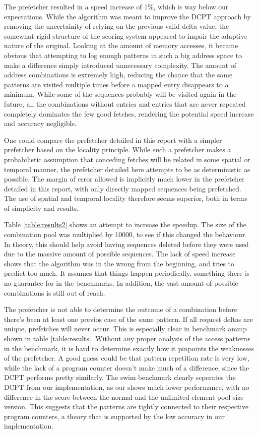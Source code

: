 The prefetcher resulted in a speed increase of 1\%, which is way below our expectations. While the algorithm was meant to improve the DCPT approach by removing the uncertainity of relying on the previous valid delta value, the somewhat rigid structure of the scoring system appeared to impair the adaptive nature of the original. Looking at the amount of memory accesses, it became obvious that attempting to log enough patterns in such a big address space to make a difference simply introduced unnecessary complexity. The amount of address combinations is extremely high, reducing the chance that the same patterns are visited multiple times before a mapped entry disappears to a minimum. While some of the sequences probably will be visited again in the future, all the combinations without entries and entries that are never repeated completely dominates the few good fetches, rendering the potential speed increase and accuracy negligible. 

One could compare the prefetcher detailed in this report with a simpler prefetcher based on the locality principle. While such a prefetcher makes a probabilistic assumption that conceding fetches will be related in some spatial or temporal manner, the prefetcher detailed here attempts to be as deterministic as possible. The margin of error allowed is implicitly much lower in the prefetcher detailed in this report, with only directly mapped sequences being prefetched. The use of spatial and temporal locality therefore seems superior, both in terms of simplicity and results.


Table \ref{table:results2} shows an attempt to increase the speedup. The size of the combination pool was multiplied by 10000, to see if this changed the behaviour. In theory, this should help avoid having sequences deleted before they were used due to the massive amount of possible sequences. The lack of speed increase shows that the algorithm was in the wrong from the beginning, and tries to predict too much. It assumes that things happen periodically, something there is no guarantee for in the benchmarks. In addition, the vast amount of possible combinations is still out of reach.

The prefetcher is not able to determine the outcome of a combination before there's been at least one previos case of the same pattern. If all request deltas are unique, prefetches will never occur. This is especially clear in benchmark ammp shown in table \ref{table:results}. Without any proper analysis of the access patterns in the benchmark, it is hard to determine exactly how it pinpoints the weaknesses of the prefetcher. A good guess could be that pattern repetition rate is very low, while the lack of a program counter doesn't make much of a difference, since the DCPT performs pretty similarly. The swim benchmark clearly seperates the DCPT from our implementation, as our shows much lower performance, with no difference in the score between the normal and the unlimited element pool size version. This suggests that the patterns are tightly connected to their respective program counters, a theory that is supported by the low accuracy in our implementation.

